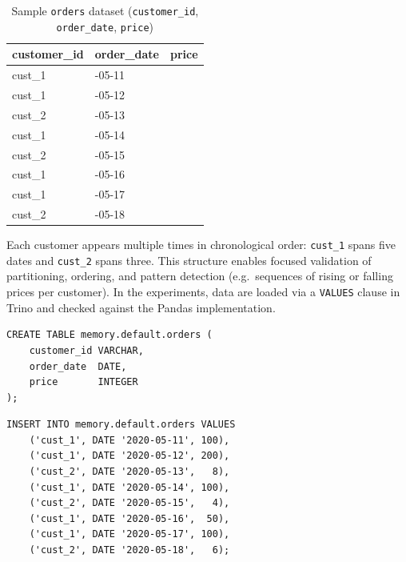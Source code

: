 \begin{table}[H]
  \centering
  \caption{Sample \texttt{orders} dataset
    (\texttt{customer\_id}, \texttt{order\_date}, \texttt{price})}
  \label{tab:orders}
  \begin{tabularx}{\textwidth}{|>{\centering\arraybackslash}X|>{\centering\arraybackslash}X|>{\centering\arraybackslash}X|}
    \hline
    \textbf{customer\_id} & \textbf{order\_date} & \textbf{price} \\
    \hline
    cust\_1 & 2020-05-11 & 100 \\
    cust\_1 & 2020-05-12 & 200 \\
    cust\_2 & 2020-05-13 &   8 \\
    cust\_1 & 2020-05-14 & 100 \\
    cust\_2 & 2020-05-15 &   4 \\
    cust\_1 & 2020-05-16 &  50 \\
    cust\_1 & 2020-05-17 & 100 \\
    cust\_2 & 2020-05-18 &   6 \\
    \hline
  \end{tabularx}
\end{table}

Each customer appears multiple times in chronological order:
\texttt{cust\_1} spans five dates and \texttt{cust\_2} spans three.
This structure enables focused validation of partitioning, ordering,
and pattern detection (e.g.\ sequences of rising or falling prices per
customer).  In the experiments, data are loaded via a
\texttt{VALUES} clause in Trino and checked against the Pandas
implementation.

\begin{lstlisting}[basicstyle=\ttfamily\small,
  backgroundcolor=\color{gray!10},
  caption={Creating the in-memory table in Trino}]
CREATE TABLE memory.default.orders (
    customer_id VARCHAR,
    order_date  DATE,
    price       INTEGER
);
\end{lstlisting}

\begin{lstlisting}[basicstyle=\ttfamily\small,
  backgroundcolor=\color{gray!10},
  caption={Inserting data into the table}]
INSERT INTO memory.default.orders VALUES
    ('cust_1', DATE '2020-05-11', 100),
    ('cust_1', DATE '2020-05-12', 200),
    ('cust_2', DATE '2020-05-13',   8),
    ('cust_1', DATE '2020-05-14', 100),
    ('cust_2', DATE '2020-05-15',   4),
    ('cust_1', DATE '2020-05-16',  50),
    ('cust_1', DATE '2020-05-17', 100),
    ('cust_2', DATE '2020-05-18',   6);
\end{lstlisting}

